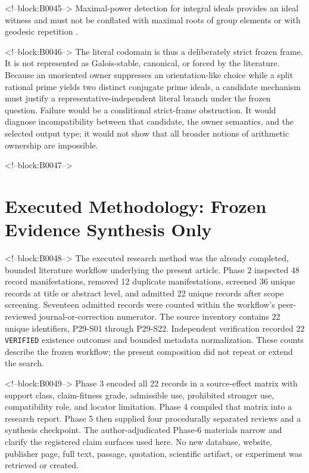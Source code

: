 \documentclass[11pt,a4paper]{article}
\begin{document}
<!--block:B0045-->
Maximal-power detection for integral ideals provides an ideal witness and must not be conflated with maximal roots of group elements or with geodesic repetition
\citep{P29-S22}.

<!--block:B0046-->
The literal codomain is thus a deliberately strict frozen frame. It is not represented as Galois-stable, canonical, or forced by the literature. Because an unoriented owner suppresses an orientation-like choice while a split rational prime yields two distinct conjugate prime ideals, a candidate mechanism must justify a representative-independent literal branch under the frozen question. Failure would be a conditional strict-frame obstruction. It would diagnose incompatibility between that candidate, the owner semantics, and the selected output type; it would not show that all broader notions of arithmetic ownership are impossible.

<!--block:B0047-->
\section{Executed Methodology: Frozen Evidence Synthesis Only}

<!--block:B0048-->
The executed research method was the already completed, bounded literature workflow underlying the present article. Phase 2 inspected 48 record manifestations, removed 12 duplicate manifestations, screened 36 unique records at title or abstract level, and admitted 22 unique records after scope screening. Seventeen admitted records were counted within the workflow's peer-reviewed journal-or-correction numerator. The source inventory contains 22 unique identifiers, P29-S01 through P29-S22. Independent verification recorded 22 \texttt{VERIFIED} existence outcomes and bounded metadata normalization. These counts describe the frozen workflow; the present composition did not repeat or extend the search.

<!--block:B0049-->
Phase 3 encoded all 22 records in a source-effect matrix with support class, claim-fitness grade, admissible use, prohibited stronger use, compatibility role, and locator limitation. Phase 4 compiled that matrix into a research report. Phase 5 then supplied four procedurally separated reviews and a synthesis checkpoint. The author-adjudicated Phase-6 materials narrow and clarify the registered claim surfaces used here. No new database, website, publisher page, full text, passage, quotation, scientific artifact, or experiment was retrieved or created.
\end{document}
